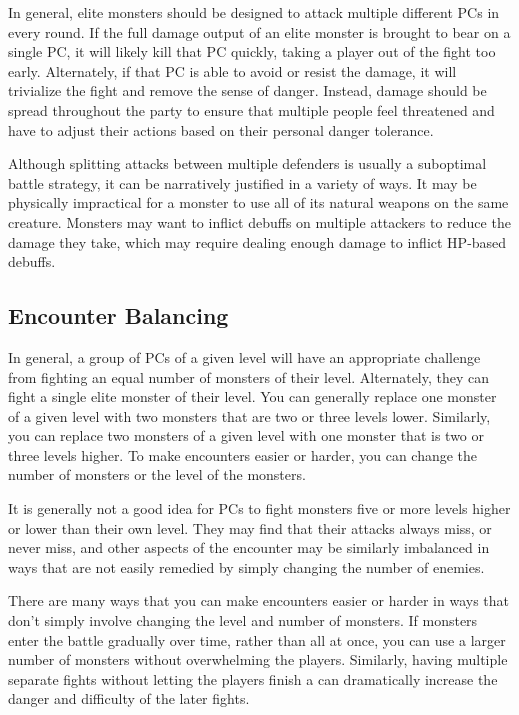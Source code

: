       In general, elite monsters should be designed to attack multiple different PCs in every round.
      If the full damage output of an elite monster is brought to bear on a single PC, it will likely kill that PC quickly, taking a player out of the fight too early.
      Alternately, if that PC is able to avoid or resist the damage, it will trivialize the fight and remove the sense of danger.
      Instead, damage should be spread throughout the party to ensure that multiple people feel threatened and have to adjust their actions based on their personal danger tolerance.

      Although splitting attacks between multiple defenders is usually a suboptimal battle strategy, it can be narratively justified in a variety of ways.
      It may be physically impractical for a monster to use all of its natural weapons on the same creature.
      Monsters may want to inflict debuffs on multiple attackers to reduce the damage they take, which may require dealing enough damage to inflict HP-based debuffs.

  \subsection{Encounter Balancing}\label{Encounter Balancing}
    In general, a group of PCs of a given level will have an appropriate challenge from fighting an equal number of monsters of their level.
    Alternately, they can fight a single elite monster of their level.
    You can generally replace one monster of a given level with two monsters that are two or three levels lower.
    Similarly, you can replace two monsters of a given level with one monster that is two or three levels higher.
    To make encounters easier or harder, you can change the number of monsters or the level of the monsters.

    It is generally not a good idea for PCs to fight monsters five or more levels higher or lower than their own level.
    They may find that their attacks always miss, or never miss, and other aspects of the encounter may be similarly imbalanced in ways that are not easily remedied by simply changing the number of enemies.

    There are many ways that you can make encounters easier or harder in ways that don't simply involve changing the level and number of monsters.
    If monsters enter the battle gradually over time, rather than all at once, you can use a larger number of monsters without overwhelming the players.
    Similarly, having multiple separate fights without letting the players finish a  can dramatically increase the danger and difficulty of the later fights.

